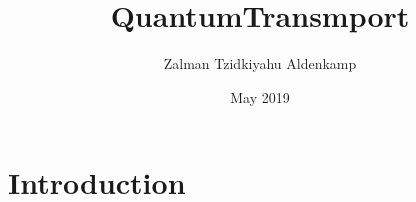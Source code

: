 \documentclass{article}
\title{QuantumTransmport}
\author{Zalman Tzidkiyahu Aldenkamp}
\date{May 2019}
\begin{document}
\maketitle

\section{Introduction}
\end{document}
